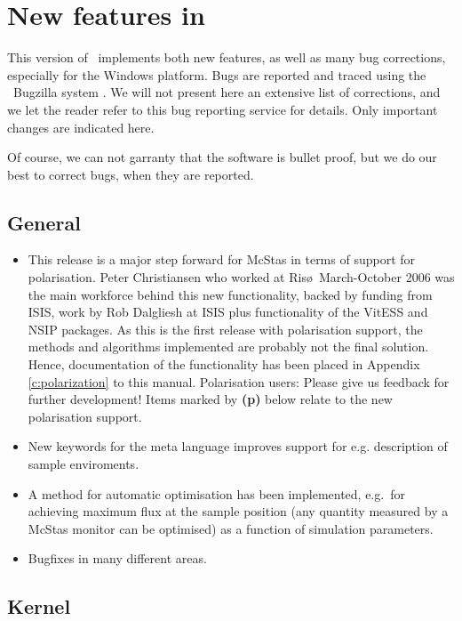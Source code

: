 
\chapter{New features in \MCS\ \version\ }
\label{c:changes}

This version of \MCS\ implements both new features, as well as many bug corrections, especially for the Windows platform. Bugs are reported and traced using the \MCS\ Bugzilla system \cite{mczilla_webpage}. We will not present here an extensive list of corrections, and we let the reader refer to this bug reporting service for details. Only important changes are indicated here.

Of course, we can not garranty that the software is bullet proof, but we do our best to correct bugs, when they are reported.

\section{General}
\label{s:new-features:general}
\begin{itemize}
\item  This release is a major step forward for McStas in terms of
  support for polarisation. Peter Christiansen who worked at Ris\o\
  March-October 2006 was the main workforce behind this new
  functionality, backed by funding from ISIS, work by Rob Dalgliesh at
  ISIS plus functionality of the VitESS and NSIP packages. As this is
  the first release with polarisation support, the methods and
  algorithms implemented are probably not the final solution. Hence,
  documentation of the functionality has been placed in Appendix
  \ref{c:polarization} to this manual. Polarisation users: Please give
  us feedback for further development! Items marked by {\bf(p)} below
  relate to the new polarisation support. 
\item New keywords for the meta language improves support for e.g. description of sample enviroments.
\item A method for automatic optimisation has been implemented, e.g.~for achieving maximum flux at the sample position (any quantity measured by a McStas monitor can be optimised) as a function of simulation parameters.
\item Bugfixes in many different areas.
\end{itemize}
\section{Kernel}
\label{s:new-features:kernel}

